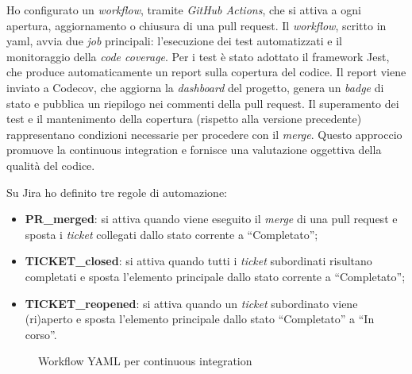 \par Ho configurato un \textit{workflow}, tramite \textit{GitHub Actions}, che si attiva a ogni apertura, aggiornamento o chiusura di una \gls{pull request}. Il \textit{workflow}, scritto in \gls{yaml}, avvia due \textit{job} principali: l’esecuzione dei test automatizzati e il monitoraggio della \textit{code coverage}. Per i test è stato adottato il \gls{framework} Jest, che produce automaticamente un report sulla copertura del codice. Il report viene inviato a Codecov, che aggiorna la \textit{dashboard} del progetto, genera un \textit{badge} di stato e pubblica un riepilogo nei commenti della \gls{pull request}. Il superamento dei test e il mantenimento della copertura (rispetto alla versione precedente) rappresentano condizioni necessarie per procedere con il \textit{merge}. Questo approccio promuove la \gls{continuous integration} e fornisce una valutazione oggettiva della qualità del codice.

\vspace{10pt}
\par\noindent Su Jira ho definito tre regole di automazione:
\begin{itemize}
  \item \textbf{PR\_merged}: si attiva quando viene eseguito il \textit{merge} di una \gls{pull request} e sposta i \textit{ticket} collegati dallo stato corrente a “Completato”;
  \item \textbf{TICKET\_closed}: si attiva quando tutti i \textit{ticket} subordinati risultano completati e sposta l'elemento principale dallo stato corrente a “Completato”;
  \item \textbf{TICKET\_reopened}: si attiva quando un \textit{ticket} subordinato viene (ri)aperto e sposta l’elemento principale dallo stato “Completato” a “In corso”.
\end{itemize}

\begin{figure}[H] 
  \centering 
  \caption{Workflow YAML per continuous integration}
\end{figure}